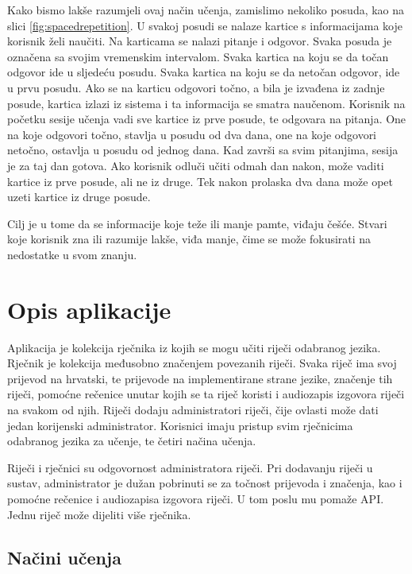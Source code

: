 Kako bismo lakše razumjeli ovaj način učenja, zamislimo nekoliko posuda, kao na slici \ref{fig:spacedrepetition}. U svakoj posudi se nalaze kartice s informacijama koje korisnik želi naučiti. Na karticama se nalazi pitanje i odgovor. Svaka posuda je označena sa svojim vremenskim intervalom. Svaka kartica na koju se da točan odgovor ide u sljedeću posudu. Svaka kartica na koju se da netočan odgovor, ide u prvu posudu. Ako se na karticu odgovori točno, a bila je izvađena iz zadnje posude, kartica izlazi iz sistema i ta informacija se smatra naučenom. Korisnik na početku sesije učenja vadi sve kartice iz prve posude, te odgovara na pitanja. One na koje odgovori točno, stavlja u posudu od dva dana, one na koje odgovori netočno, ostavlja u posudu od jednog dana. Kad završi sa svim pitanjima, sesija je za taj dan gotova. Ako korisnik odluči učiti odmah dan nakon, može vaditi kartice iz prve posude, ali ne iz druge. Tek nakon prolaska dva dana može opet uzeti kartice iz druge posude.

Cilj je u tome da se informacije koje teže ili manje pamte, viđaju češće. Stvari koje korisnik zna ili razumije lakše, viđa manje, čime se može fokusirati na nedostatke u svom znanju.

\eject
\section{Opis aplikacije}

Aplikacija je kolekcija rječnika iz kojih se mogu učiti riječi odabranog jezika. Rječnik je kolekcija međusobno značenjem povezanih riječi. Svaka riječ ima svoj prijevod na hrvatski, te prijevode na implementirane strane jezike, značenje tih riječi, pomoćne rečenice unutar kojih se ta riječ koristi i audiozapis izgovora riječi na svakom od njih. Riječi dodaju administratori riječi, čije ovlasti može dati jedan korijenski administrator. Korisnici imaju pristup svim rječnicima odabranog jezika za učenje, te četiri načina učenja.

Riječi i rječnici su odgovornost administratora riječi. Pri dodavanju riječi u sustav, administrator je dužan pobrinuti se za točnost prijevoda i značenja, kao i pomoćne rečenice i audiozapisa izgovora riječi. U tom poslu mu pomaže API. Jednu riječ može dijeliti više rječnika. 

\subsection{Načini učenja} 

